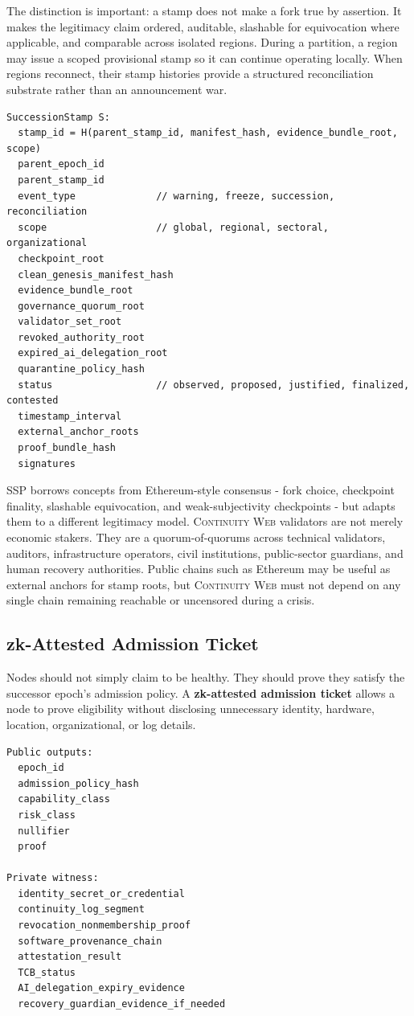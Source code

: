 \documentclass[11pt,letterpaper]{article}
\newcommand{\CW}{\textsc{Continuity Web}}
\newcommand{\Term}[1]{\textbf{#1}}
\begin{document}
The distinction is important: a stamp does not make a fork true by assertion. It makes the legitimacy claim ordered, auditable, slashable for equivocation where applicable, and comparable across isolated regions. During a partition, a region may issue a scoped provisional stamp so it can continue operating locally. When regions reconnect, their stamp histories provide a structured reconciliation substrate rather than an announcement war.

\begin{lstlisting}[title={\textbf{Succession Stamp structure}}]
SuccessionStamp S:
  stamp_id = H(parent_stamp_id, manifest_hash, evidence_bundle_root, scope)
  parent_epoch_id
  parent_stamp_id
  event_type              // warning, freeze, succession, reconciliation
  scope                   // global, regional, sectoral, organizational
  checkpoint_root
  clean_genesis_manifest_hash
  evidence_bundle_root
  governance_quorum_root
  validator_set_root
  revoked_authority_root
  expired_ai_delegation_root
  quarantine_policy_hash
  status                  // observed, proposed, justified, finalized, contested
  timestamp_interval
  external_anchor_roots
  proof_bundle_hash
  signatures
\end{lstlisting}

SSP borrows concepts from Ethereum-style consensus - fork choice, checkpoint finality, slashable equivocation, and weak-subjectivity checkpoints - but adapts them to a different legitimacy model. \CW{} validators are not merely economic stakers. They are a quorum-of-quorums across technical validators, auditors, infrastructure operators, civil institutions, public-sector guardians, and human recovery authorities. Public chains such as Ethereum may be useful as external anchors for stamp roots, but \CW{} must not depend on any single chain remaining reachable or uncensored during a crisis.

\subsection{zk-Attested Admission Ticket}

Nodes should not simply claim to be healthy. They should prove they satisfy the successor epoch's admission policy. A \Term{zk-attested admission ticket} allows a node to prove eligibility without disclosing unnecessary identity, hardware, location, organizational, or log details.

\begin{lstlisting}[title={\textbf{zk-attested admission ticket}}]
Public outputs:
  epoch_id
  admission_policy_hash
  capability_class
  risk_class
  nullifier
  proof

Private witness:
  identity_secret_or_credential
  continuity_log_segment
  revocation_nonmembership_proof
  software_provenance_chain
  attestation_result
  TCB_status
  AI_delegation_expiry_evidence
  recovery_guardian_evidence_if_needed
\end{lstlisting}
\end{document}
